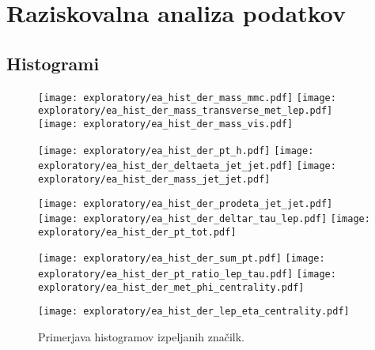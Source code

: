 \appendix
{}
\chapter{Raziskovalna analiza podatkov}
\label{ch:dodatek_raziskovalna}
\newpage
\section{Histogrami}

\begin{figure}[ht]
	\label{hist_der}
	\texttt{[image: exploratory/ea\_hist\_der\_mass\_mmc.pdf]}
	\texttt{[image: exploratory/ea\_hist\_der\_mass\_transverse\_met\_lep.pdf]}
	\texttt{[image: exploratory/ea\_hist\_der\_mass\_vis.pdf]}
	
	\texttt{[image: exploratory/ea\_hist\_der\_pt\_h.pdf]}
	\texttt{[image: exploratory/ea\_hist\_der\_deltaeta\_jet\_jet.pdf]}
	\texttt{[image: exploratory/ea\_hist\_der\_mass\_jet\_jet.pdf]}
	
	\texttt{[image: exploratory/ea\_hist\_der\_prodeta\_jet\_jet.pdf]}
	\texttt{[image: exploratory/ea\_hist\_der\_deltar\_tau\_lep.pdf]}
	\texttt{[image: exploratory/ea\_hist\_der\_pt\_tot.pdf]}	
	
	\texttt{[image: exploratory/ea\_hist\_der\_sum\_pt.pdf]}
	\texttt{[image: exploratory/ea\_hist\_der\_pt\_ratio\_lep\_tau.pdf]}
	\texttt{[image: exploratory/ea\_hist\_der\_met\_phi\_centrality.pdf]}
	
	\texttt{[image: exploratory/ea\_hist\_der\_lep\_eta\_centrality.pdf]}
	
	\caption{Primerjava histogramov izpeljanih značilk.}
	\label{sl:histogram_izpeljane}
\end{figure}

